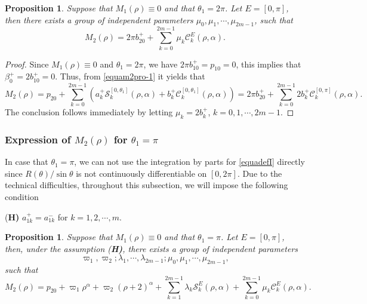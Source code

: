 \documentclass[11pt]{amsart}
\newtheorem{prop}[thm]{Proposition}
\theoremstyle{remark}
\theoremstyle{definition}
\begin{document}
\begin{prop} \label{pro5cor}  Suppose that   $M_1(\rho)\equiv 0$ and that $\theta_1=2\pi$. Let   $E=[0,\pi]$, then
     there exists a group of   independent parameters
  $\mu_0,  \mu_1, \cdots,\mu_{2m-1}$,     such that
\begin{equation*} \label{equam2cor-2}
M_2(\rho)=2\pi b_{20}^++\sum_{k=0}^{2m-1}\mu_{k}\mathcal{C}_{k}^{E}(\rho,\alpha).
\end{equation*}
\end{prop}


\begin{proof}
 Since $M_1(\rho)\equiv 0$ and  $\theta_1=2\pi$, we have
 $2\pi b_{10}^+=p_{10}=0$, this implies that $\beta_0^+=2 b_{10}^+=0$.
Thus,  from \eqref{equam2pro-1} it yields  that
\begin{equation*} \label{equam2pro-1-2}
M_2(\rho)=p_{20}+\sum_{k=0}^{2m-1}\left(a_{k}^{+}\mathcal{S}_{k}^{[0,\theta_1]}(\rho,\alpha)+b_{k}^{+}\mathcal{C}_{k}^{[0,\theta_1]}(\rho,\alpha)\right)=2\pi b_{20}^++\sum_{k=0}^{2m-1}2b_{k}^{+}\mathcal{C}_{k}^{[0,\pi]}(\rho,\alpha).
\end{equation*}
The conclusion follows immediately  by letting $\mu_k=2b_{k}^{+}$,  $k=0,1,\cdots, 2m-1$. \end{proof}









\subsubsection{Expression of $M_{2}(\rho)$ for $\theta_1=\pi$}

\hspace{0.3cm}




In case that $\theta_1=\pi$, we can not use the integration by parts for  \eqref{equadefI} directly  since $R(\theta)/\sin \theta$ is not continuously differentiable on $[0, 2\pi]$.
Due to the  technical difficulties,  throughout  this subsection, we will impose the following condition


{(\bf{H})   }  $a_{1k}^+=a_{1k}^-$ for $k=1, 2, \cdots, m$.

\begin{prop} \label{cor1}   Suppose that   $M_1(\rho)\equiv 0$ and that $\theta_1=\pi$. Let   $E=[0,\pi]$, then, under the assumption {(\bf{H})},  there exists a group of independent parameters
\begin{equation*} \label{freepar-1}\varpi_1,  \varpi_2; \lambda_1, \cdots,\lambda_{2m-1}; \mu_0, \mu_1, \cdots,\mu_{2m-1},\end{equation*}
   such that
\begin{equation*} \label{equam2cor-1}
M_2(\rho)=p_{20}
+\varpi_1 \rho^{\alpha}+\varpi_2(\rho+2)^{\alpha}+\sum_{k=1}^{2m-1}\lambda_k\mathcal{S}_{k}^{E}(\rho,\alpha)
+\sum_{k=0}^{2m-1}\mu_k\mathcal{C}_{k}^{E}(\rho,\alpha).
\end{equation*}
\end{prop}
\end{document}
